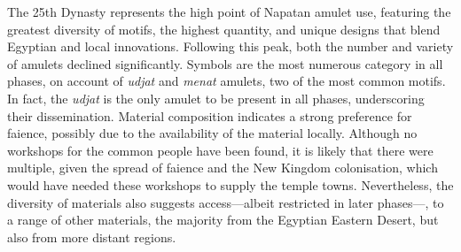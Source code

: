 
The 25th Dynasty represents the high point of Napatan amulet use, featuring the greatest diversity of motifs, the highest quantity, and unique designs that blend Egyptian and local innovations. Following this peak, both the number and variety of amulets declined significantly. Symbols are the most numerous category in all phases, on account of \textit{udjat} and \textit{menat} amulets, two of the most common motifs. In fact, the \textit{udjat} is the only amulet to be present in all phases, underscoring their dissemination. Material composition indicates a strong preference for faience, possibly due to the availability of the material locally. Although no workshops for the common people have been found, it is likely that there were multiple, given the spread of faience and the New Kingdom colonisation, which would have needed these workshops to supply the temple towns. Nevertheless, the diversity of materials also suggests access---albeit restricted in later phases---, to a range of other materials, the majority from the Egyptian Eastern Desert, but also from more distant regions.
 